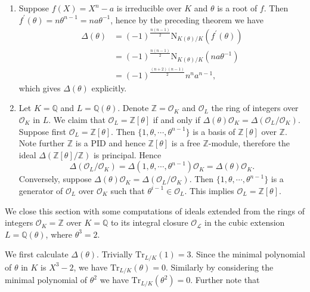 \begin{example}\em
\begin{enumerate}
    \item Suppose $f(X)=X^n-a$ is irreducible over $K$ and $\theta$ is a root of $f$. Then $f^\prime(\theta)=n\theta^{n-1}=na\theta^{-1}$, hence by the preceding theorem we have 
    $$
    \begin{aligned}
        \Delta \left( \theta \right) &=\left( -1 \right) ^{\frac{n\left( n-1 \right)}{2}}\mathrm{N}_{K\left( \theta \right) /K}\left( f^{\prime}\left( \theta \right) \right) \\
        &=\left( -1 \right) ^{\frac{n\left( n-1 \right)}{2}}\mathrm{N}_{K\left( \theta \right) /K}\left( na\theta ^{-1} \right) \\
        &=\left( -1 \right) ^{\frac{\left( n+2 \right) \left( n-1 \right)}{2}}n^na^{n-1}, 
    \end{aligned}
    $$
    which gives $\Delta(\theta)$ explicitly.
    \item Let $K=\mathbb{Q}$ and $L=\mathbb{Q}(\theta)$. Denote $\mathbb{Z}=\mathcal{O}_K$ and $\mathcal{O}_L$ the ring of integers over $\mathcal{O}_K$ in $L$. We claim that $\mathcal{O}_L=\mathbb{Z}[\theta]$ if and only if $\Delta(\theta)\mathcal{O}_K=\Delta(\mathcal{O}_L/\mathcal{O}_K)$. Suppose first $\mathcal{O}_L=\mathbb{Z}[\theta]$. Then $\{1,\theta,\cdots,\theta^{n-1}\}$ is a basis of $\mathbb{Z}[\theta]$ over $\mathbb{Z}$. Note further $\mathbb{Z}$ is a PID and hence $\mathbb{Z}[\theta]$ is a free $\mathbb{Z}$-module, therefore the ideal $\Delta(\mathbb{Z}[\theta]/\mathbb{Z})$ is principal. Hence 
    $$
    \Delta \left( \mathcal{O} _L/\mathcal{O} _K \right) =\Delta \left( 1,\theta ,\cdots ,\theta ^{n-1} \right) \mathcal{O} _K=\Delta \left( \theta \right) \mathcal{O} _K.
    $$
    Conversely, suppose $\Delta(\theta)\mathcal{O}_K=\Delta(\mathcal{O}_L/\mathcal{O}_K)$. Then $\{1,\theta,\cdots,\theta^{n-1}\}$ is a generator of $\mathcal{O}_L$ over $\mathcal{O}_K$ such that $\theta^{i-1}\in\mathcal{O}_L$. This implies $\mathcal{O}_L=\mathbb{Z}[\theta]$.
\end{enumerate}
\end{example}
We close this section with some computations of ideals extended from the rings of integers $\mathcal{O}_K=\mathbb{Z}$ over $K=\mathbb{Q}$ to its integral closure $\mathcal{O_L}$ in the cubic extension $L=\mathbb{Q}(\theta)$, where $\theta^3=2$.\par
We first calculate $\Delta(\theta)$. Trivially $\mathrm{Tr}_{L/K}(1)=3$. Since the minimal polynomial of $\theta$ in $K$ is $X^3-2$, we have $\mathrm{Tr}_{L/K}(\theta)=0$. Similarly by considering the minimal polynomial of $\theta^2$ we have $\mathrm{Tr}_{L/K}(\theta^2)=0$. Further note that 
